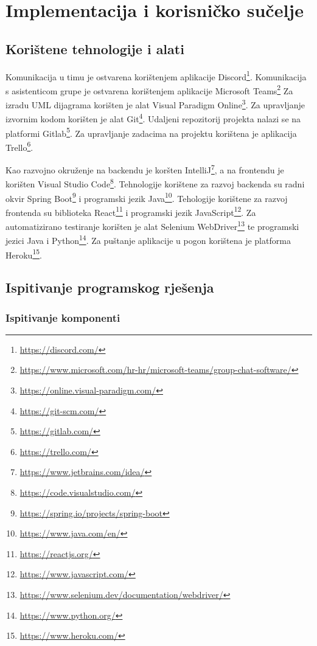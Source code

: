 \chapter{Implementacija i korisničko sučelje}
		
		
		\section{Korištene tehnologije i alati}
		
			Komunikacija u timu je ostvarena korištenjem aplikacije Discord\footnote{\url{https://discord.com/}}. Komunikacija s asistenticom grupe je ostvarena korištenjem aplikacije Microsoft Teams\footnote{\url{https://www.microsoft.com/hr-hr/microsoft-teams/group-chat-software/}} Za izradu UML dijagrama korišten je alat Visual Paradigm Online\footnote{\url{https://online.visual-paradigm.com/}}. Za upravljanje izvornim kodom korišten je alat Git\footnote{\url{https://git-scm.com/}}. Udaljeni repozitorij projekta nalazi se na platformi Gitlab\footnote{\url{https://gitlab.com/}}. Za upravljanje zadacima na projektu korištena je aplikacija Trello\footnote{\url{https://trello.com/}}.
			
			Kao razvojno okruženje na backendu je koršten IntelliJ\footnote{\url{https://www.jetbrains.com/idea/}}, a na frontendu je korišten Visual Studio Code\footnote{\url{https://code.visualstudio.com/}}. Tehnologije korištene za razvoj backenda su radni okvir Spring Boot\footnote{\url{https://spring.io/projects/spring-boot}} i programski jezik Java\footnote{\url{https://www.java.com/en/}}. Tehologije korištene za razvoj frontenda su biblioteka React\footnote{\url{https://reactjs.org/}} i programski jezik JavaScript\footnote{\url{https://www.javascript.com/}}. Za automatizirano testiranje korišten je alat Selenium WebDriver\footnote{\url{https://www.selenium.dev/documentation/webdriver/}} te programski jezici Java i Python\footnote{\url{https://www.python.org/}}. Za puštanje aplikacije u pogon korištena je platforma Heroku\footnote{\url{https://www.heroku.com/}}.
			
			
			\eject 
		
	
		\section{Ispitivanje programskog rješenja}
					
			\subsection{Ispitivanje komponenti}

